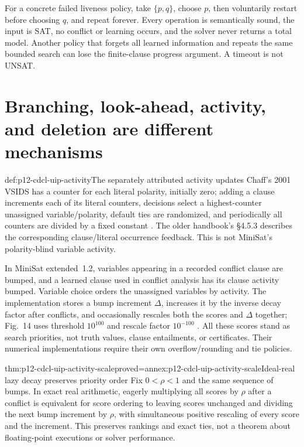 For a concrete failed liveness policy, take \(\{p,q\}\), choose \(p\),
then voluntarily restart before choosing \(q\), and repeat forever.  Every
operation is semantically sound, the input is SAT, no conflict or learning
occurs, and the solver never returns a total model.  Another policy that
forgets all learned information and repeats the same bounded search can lose
the finite-clause progress argument.  A timeout is not UNSAT.

\section{Branching, look-ahead, activity, and deletion are different mechanisms}

\begin{hbdefinition}{def:p12-cdcl-uip-activity}{The separately attributed activity updates}
Chaff's 2001 VSIDS has a counter for each literal polarity, initially zero;
adding a clause increments each of its literal counters, decisions select a
highest-counter unassigned variable/polarity, default ties are randomized, and
periodically all counters are divided by a fixed constant
\cite[Sec.~3]{MoskewiczEtAl2001ChaffV56}.  The older handbook's §4.5.3
describes the corresponding clause/literal occurrence feedback.  This is not
MiniSat's polarity-blind variable activity.

In MiniSat extended~1.2, variables appearing in a recorded conflict clause are
bumped, and a learned clause used in conflict analysis has its clause activity
bumped.  Variable choice orders the unassigned variables by activity.  The
implementation stores a bump increment \(\Delta\), increases it by the
inverse decay factor after conflicts, and occasionally rescales both the
scores and \(\Delta\) together; Fig.~14 uses threshold \(10^{100}\) and
rescale factor \(10^{-100}\)
\cite[Secs.~3, 4.6; Figs.~8, 14]{EenSorenssonMiniSatExtended12}.
All these scores stand as search priorities, not truth values, clause
entailments, or certificates.  Their numerical implementations require their
own overflow/rounding and tie policies.
\end{hbdefinition}

\begin{hblemma}{thm:p12-cdcl-uip-activity-scale}{proved=annex:p12-cdcl-uip-activity-scale}{Ideal-real lazy decay preserves priority order}
Fix \(0<\rho<1\) and the same sequence of bumps.  In exact real arithmetic,
eagerly multiplying all scores by \(\rho\) after a conflict is equivalent
for score ordering to leaving scores unchanged and dividing the next bump
increment by \(\rho\), with simultaneous positive rescaling of every score
and the increment.  This preserves rankings and exact ties, not a theorem
about floating-point executions or solver performance.
\end{hblemma}

